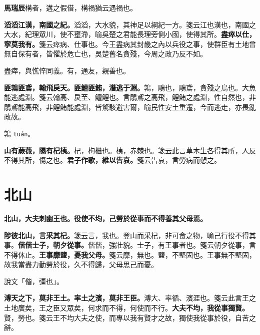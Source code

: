 \begin{quoting}\textbf{馬瑞辰}構者，遘之假借，構禍猶云遇禍也。\end{quoting}

\textbf{滔滔江漢，南國之紀。}{\footnotesize 滔滔，大水貌，其神足以綱紀一方。箋云江也漢也，南國之大水，紀理眾川，使不壅滯，喻吳楚之君能長理旁側小國，使得其所。}\textbf{盡瘁以仕，寧莫我有。}{\footnotesize 箋云瘁病、仕事也。今王盡病其封畿之內以兵役之事，使群臣有土地曾無自保有者，皆懼於危亡也，吳楚舊名貪殘，今周之政乃反不如。}

\begin{quoting}盡瘁，與憔悴同義。有，通友，親善也。\end{quoting}

\textbf{匪鶉匪鳶，翰飛戾天。匪鱣匪鮪，潛逃于淵。}{\footnotesize 鶉，鵰也，鵰鳶，貪殘之鳥也。大魚能逃處淵。箋云翰高、戾至、鱣鯉也。言鵰鳶之高飛，鯉鮪之處淵，性自然也，非鵰鳶能高飛，非鯉鮪能處淵，皆驚駭避害爾，喻民性安土重遷，今而逃走，亦畏亂政故。}

\begin{quoting}鶉 \texttt{tuán}。\end{quoting}

\textbf{山有蕨薇，隰有杞桋。}{\footnotesize 杞，枸檵也。桋，赤棘也。箋云此言草木生各得其所，人反不得其所，傷之也。}\textbf{君子作歌，維以告哀。}{\footnotesize 箋云告哀，言勞病而愬之。}

\section{北山}


\textbf{北山，大夫刺幽王也。役使不均，己勞於從事而不得養其父母焉。}

\textbf{陟彼北山，言采其杞。}{\footnotesize 箋云言，我也。登山而采杞，非可食之物，喻己行役不得其事。}\textbf{偕偕士子，朝夕從事。}{\footnotesize 偕偕，強壯貌。士子，有王事者也。箋云朝夕從事，言不得休止。}\textbf{王事靡盬，憂我父母。}{\footnotesize 箋云靡，無也。盬，不堅固也。王事無不堅固，故我當盡力勤勞於役，久不得歸，父母思己而憂。}

\begin{quoting}說文「偕，彊也」。\end{quoting}

\textbf{溥天之下，莫非王土。率土之濱，莫非王臣。}{\footnotesize 溥大、率循、濱涯也。箋云此言王之土地廣矣，王之臣又眾矣，何求而不得，何使而不行。}\textbf{大夫不均，我從事獨賢。}{\footnotesize 賢，勞也。箋云王不均大夫之使，而專以我有賢才之故，獨使我從事於役，自苦之辭。}

